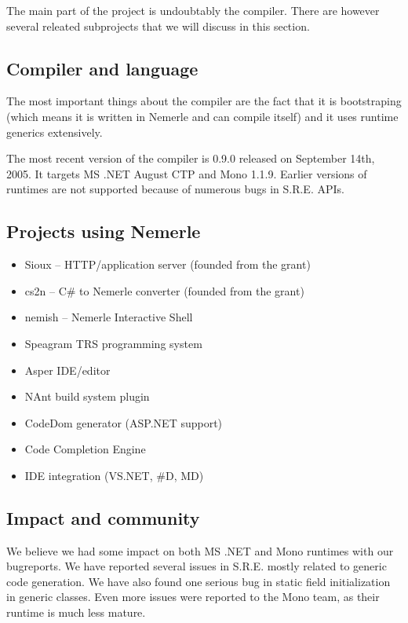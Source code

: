 \documentclass{article}
\begin{document}
The main part of the project is undoubtably the compiler.
There are however several releated subprojects that we will
discuss in this section.

\subsection{Compiler and language}

The most important things about the compiler are the
fact that it is bootstraping (which means it is written
in Nemerle and can compile itself) and it uses runtime
generics extensively.

The most recent version of the compiler is 0.9.0 released
on September 14th, 2005. It targets MS .NET August CTP
and Mono 1.1.9. Earlier versions of runtimes are not
supported because of numerous bugs in S.R.E. APIs.

\subsection{Projects using Nemerle}

\begin{itemize}
  \item Sioux -- HTTP/application server (founded from the grant)
  \item cs2n -- C\# to Nemerle converter (founded from the grant)
  \item nemish -- Nemerle Interactive Shell
  \item Speagram TRS programming system
  \item Asper IDE/editor
  \item NAnt build system plugin
  \item CodeDom generator (ASP.NET support)
  \item Code Completion Engine
  \item IDE integration (VS.NET, \#D, MD)
\end{itemize}


\subsection{Impact and community}

We believe we had some impact on both MS .NET and Mono runtimes
with our bugreports. We have reported several issues in S.R.E.
mostly related to generic code generation. We have also found one
serious bug in static field initialization in generic classes.
Even more issues were reported to the Mono team, as their
runtime is much less mature.
\end{document}
